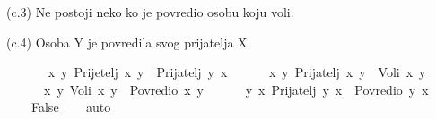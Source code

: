 \begin{isabellebody}
\begin{exercise}[subtitle=Zapisivanje logičkih formula]
\begin{isamarkuptext}
(c.3) Ne postoji neko ko je povredio osobu koju voli.%
\end{isamarkuptext}\isamarkuptrue%
%
\begin{isamarkuptext}%
(c.4) Osoba Y je povredila svog prijatelja X.%
\end{isamarkuptext}\isamarkuptrue%
\isamarkupfalse%
\ {\isachardoublequoteopen}\isanewline
\ \ \ \ {\isacharparenleft}{\kern0pt}{\isasymforall}\ x\ y{\isachardot}{\kern0pt}\ Prijetelj\ x\ y\ {\isasymlongrightarrow}\ Prijatelj\ y\ x{\isacharparenright}{\kern0pt}\ {\isasymand}\isanewline
\ \ \ \ {\isacharparenleft}{\kern0pt}{\isasymforall}\ x\ y{\isachardot}{\kern0pt}\ Prijatelj\ x\ y\ {\isasymlongrightarrow}\ Voli\ x\ y{\isacharparenright}{\kern0pt}\ {\isasymand}\isanewline
\ \ \ \ {\isacharparenleft}{\kern0pt}{\isasymnot}\ {\isacharparenleft}{\kern0pt}{\isasymexists}\ x\ y{\isachardot}{\kern0pt}\ Voli\ x\ y\ {\isasymand}\ Povredio\ x\ y{\isacharparenright}{\kern0pt}{\isacharparenright}{\kern0pt}\ {\isasymand}\isanewline
\ \ \ \ {\isacharparenleft}{\kern0pt}{\isasymexists}\ y\ x{\isachardot}{\kern0pt}\ Prijatelj\ y\ x\ {\isasymand}\ Povredio\ y\ x{\isacharparenright}{\kern0pt}\ {\isasymlongrightarrow}\isanewline
\ \ \ \ False{\isachardoublequoteclose}\isanewline
%
\isadelimproof
\ \ %
\endisadelimproof
%
\isatagproof
{}\isamarkupfalse%
\ auto%
\endisatagproof
{\isafoldproof}%
%
\isadelimproof
%
\endisadelimproof
%
\end{exercise}
%
\isadelimtheory
%
\endisadelimtheory
%
\isatagtheory
%
\endisatagtheory
{\isafoldtheory}%
%
\isadelimtheory
%
\endisadelimtheory
%
\end{isabellebody}%
\endinput
